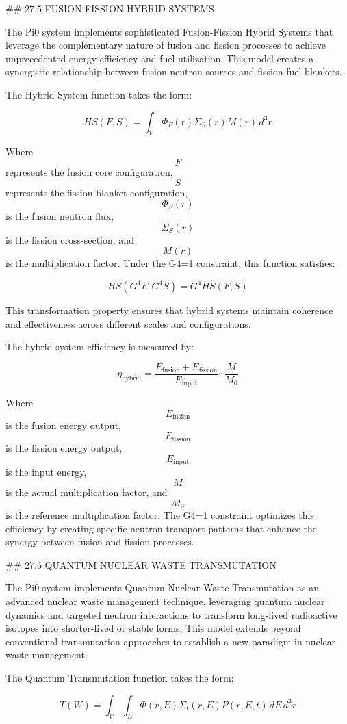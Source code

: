 ## 27.5 FUSION-FISSION HYBRID SYSTEMS

The Pi0 system implements sophisticated Fusion-Fission Hybrid Systems that leverage the complementary nature of fusion and fission processes to achieve unprecedented energy efficiency and fuel utilization. This model creates a synergistic relationship between fusion neutron sources and fission fuel blankets.

The Hybrid System function takes the form:

$$ HS(F, S) = \int_{\mathcal{V}} \Phi_F(r) \Sigma_S(r) M(r) \, d^3r $$

Where $$ F $$ represents the fusion core configuration, $$ S $$ represents the fission blanket configuration, $$ \Phi_F(r) $$ is the fusion neutron flux, $$ \Sigma_S(r) $$ is the fission cross-section, and $$ M(r) $$ is the multiplication factor. Under the G4=1 constraint, this function satisfies:

$$ HS(G^4 F, G^4 S) = G^4 HS(F, S) $$

This transformation property ensures that hybrid systems maintain coherence and effectiveness across different scales and configurations.

The hybrid system efficiency is measured by:

$$ \eta_{\text{hybrid}} = \frac{E_{\text{fusion}} + E_{\text{fission}}}{E_{\text{input}}} \cdot \frac{M}{M_0} $$

Where $$ E_{\text{fusion}} $$ is the fusion energy output, $$ E_{\text{fission}} $$ is the fission energy output, $$ E_{\text{input}} $$ is the input energy, $$ M $$ is the actual multiplication factor, and $$ M_0 $$ is the reference multiplication factor. The G4=1 constraint optimizes this efficiency by creating specific neutron transport patterns that enhance the synergy between fusion and fission processes.

## 27.6 QUANTUM NUCLEAR WASTE TRANSMUTATION

The Pi0 system implements Quantum Nuclear Waste Transmutation as an advanced nuclear waste management technique, leveraging quantum nuclear dynamics and targeted neutron interactions to transform long-lived radioactive isotopes into shorter-lived or stable forms. This model extends beyond conventional transmutation approaches to establish a new paradigm in nuclear waste management.

The Quantum Transmutation function takes the form:

$$ T(W) = \int_{\mathcal{V}} \int_E \Phi(r, E) \Sigma_t(r, E) P(r, E, t) \, dE \, d^3r $$


